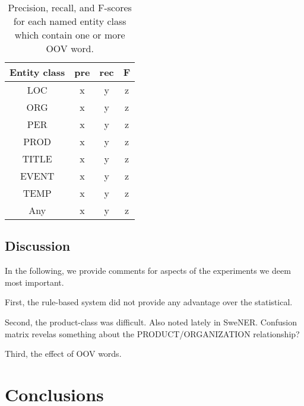 \documentclass[11pt]{article}
\begin{document}
\begin{table}[t!]
\begin{center}
\begin{tabular}{cccc} 
Entity class & pre & rec & F \\
\hline
\noalign{\smallskip}
LOC  & x & y & z  \\
ORG  & x & y & z  \\
PER  & x & y & z  \\
PROD  & x & y & z  \\
TITLE  & x & y & z  \\
EVENT  & x & y & z  \\
TEMP  & x & y & z  \\
\hline
\noalign{\smallskip}
Any & x & y & z  \\
\end{tabular}
\end{center}
\caption{Precision, recall, and F-scores for each named entity class which contain one or more OOV word.}
\label{tab: oov precision recall and f-scores}
\end{table}

\subsection{Discussion}
\label{sec: discussion}

In the following, we provide comments for aspects of the experiments we deem most important. 

First, the rule-based system did not provide any advantage over the statistical.

Second, the product-class was difficult. Also noted lately in SweNER. Confusion matrix revelas something about the PRODUCT/ORGANIZATION relationship?

Third, the effect of OOV words.




\section{Conclusions}
\label{sec: conclusions}





\newpage

%

\end{document}
